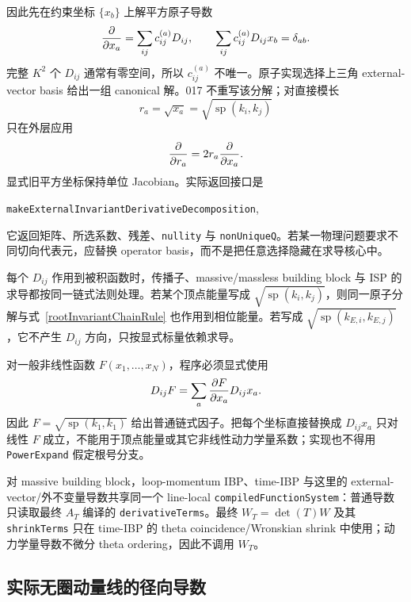 ﻿\documentclass[a4paper,11pt]{article}
\begin{document}
因此先在约束坐标 $\{x_b\}$ 上解平方原子导数
\begin{equation}
  {\partial\over\partial x_a}
  =
  \sum_{ij}c^{(a)}_{ij}D_{ij},
  \qquad
  \sum_{ij}c^{(a)}_{ij}D_{ij}x_b=\delta_{ab}.
  \label{externalInvariantDecomposition}
\end{equation}
完整 $K^2$ 个 $D_{ij}$ 通常有零空间，所以 $c^{(a)}_{ij}$ 不唯一。原子实现选择上三角 external-vector basis 给出一组 canonical 解。017 不重写该分解；对直接模长
\begin{equation}
  r_a=\sqrt{x_a}=\sqrt{\operatorname{sp}(k_i,k_j)}
\end{equation}
只在外层应用
\begin{equation}
  {\partial\over\partial r_a}=2r_a{\partial\over\partial x_a}.
  \label{rootInvariantChainRule}
\end{equation}
显式旧平方坐标保持单位 Jacobian。实际返回接口是
\begin{center}
  \texttt{makeExternalInvariantDerivativeDecomposition},
\end{center}
它返回矩阵、所选系数、残差、\verb|nullity| 与 \verb|nonUniqueQ|。若某一物理问题要求不同切向代表元，应替换 operator basis，而不是把任意选择隐藏在求导核心中。

每个 $D_{ij}$ 作用到被积函数时，传播子、massive/massless building block 与 ISP 的求导都按同一链式法则处理。若某个顶点能量写成 $\sqrt{\operatorname{sp}(k_i,k_j)}$，则同一原子分解与式~\eqref{rootInvariantChainRule} 也作用到相位能量。若写成 $\sqrt{\operatorname{sp}(k_{E,i},k_{E,j})}$，它不产生 $D_{ij}$ 方向，只按显式标量依赖求导。

对一般非线性函数 $F(x_1,\ldots,x_N)$，程序必须显式使用
\begin{equation}
  D_{ij}F
  =\sum_a {\partial F\over\partial x_a}D_{ij}x_a.
  \label{externalVectorFunctionChainRule}
\end{equation}
因此 $F=\sqrt{\operatorname{sp}(k_1,k_1)}$ 给出普通链式因子。把每个坐标直接替换成 $D_{ij}x_a$ 只对线性 $F$ 成立，不能用于顶点能量或其它非线性动力学量系数；实现也不得用 \texttt{PowerExpand} 假定根号分支。

对 massive building block，loop-momentum IBP、time-IBP 与这里的 external-vector/外不变量导数共享同一个 line-local \texttt{compiledFunction\allowbreak System}：普通导数只读取最终 $A_T$ 编译的 \texttt{derivative\allowbreak Terms}。最终 $W_T=\det(T)W$ 及其 \texttt{shrink\allowbreak Terms} 只在 time-IBP 的 theta coincidence/Wronskian shrink 中使用；动力学量导数不微分 theta ordering，因此不调用 $W_T$。

\subsection{实际无圈动量线的径向导数}
\end{document}
